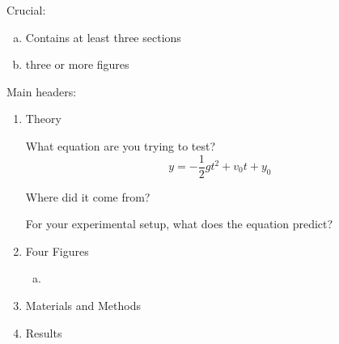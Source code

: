 \documentclass{article}
\begin{document}
\insertTitle

Crucial:
\begin{enumerate}[(a)]
    \item Contains at least three sections
    \item three or more figures
\end{enumerate}

Main headers:
\begin{enumerate}[(1)]
    \item Theory

    What equation are you trying to test?
    \[
        y = -\frac{1}{2}gt^2 + v_0 t + y_0
    \]

    Where did it come from?

    For your experimental setup, what does the equation predict?

    \item Four Figures
    \begin{enumerate}[(a)]
        \item 
    \end{enumerate}
    \item Materials and Methods
    \item Results
\end{enumerate}
\end{document}
